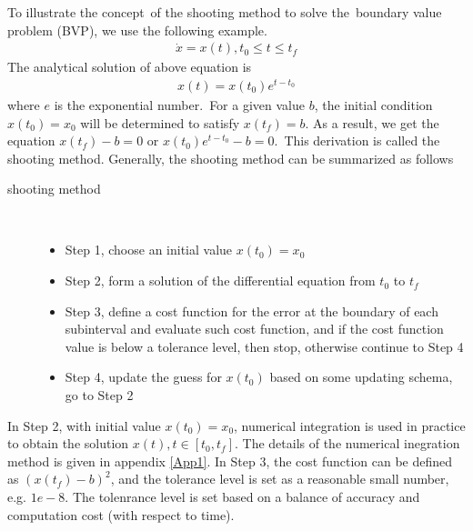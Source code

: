 \documentclass  [
  paper    = a4,
  BCOR     = 10mm,
  twoside,
  fontsize = 12pt,
  fleqn,
  toc      = bibnumbered,
  toc      = listofnumbered,
  numbers  = noendperiod,
  headings = normal,
  listof   = leveldown,
  version  = 3.03
]                                       {scrreprt}
\newcommand{\<}{\langle}
\renewcommand{\>}{\rangle}
\begin{document}
To illustrate the concept of the shooting method to solve the boundary value problem (BVP), we use the following example.
\begin{align*}
	\dot{x} = x(t), t_0 \leq t \leq t_f 
\end{align*}
The analytical solution of above equation is 
\begin{align*}
	x(t) = x(t_0)e^{t - t_0}
\end{align*}
where $e$ is the exponential number. For a given value $b$, the initial condition $x(t_0) = x_0$ will be determined to satisfy $x(t_f) = b$. As a result, we get the equation $x(t_f)-b = 0$ or $x(t_0)e^{t - t_0}-b = 0$. This derivation is called the shooting method. Generally, the shooting method can be summarized as follows
\begin{description}
	\item[shooting method] \
	\begin{itemize}
		\item Step 1, choose an initial value $x(t_0)=x_0$ 
		\item Step 2, form a solution of the differential equation from $t_0$ to $t_f$
		\item Step 3, define a cost function for the error at the boundary of each subinterval and evaluate such cost function, and if the cost function value is below a tolerance level, then stop, otherwise continue to Step 4 
		\item Step 4, update the guess for $x(t_0)$ based on some updating schema, go to Step 2
	\end{itemize}
\end{description}
In Step 2, with initial value $x(t_0)=x_0$, numerical integration is used in practice to obtain the solution $x(t), t \in [t_0, t_f]$. The details of the numerical inegration method is given in appendix \ref{App1}. In Step 3, the cost function can be defined as $(x(t_f)-b)^2$, and the tolerance level is set as a reasonable small number, e.g. $1e-8$. The tolenrance level is set based on a balance of accuracy and computation cost (with respect to time). 
\end{document}
